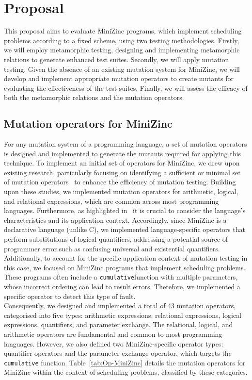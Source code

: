 \section{Proposal}
\label{sec:proposal}
This proposal aims to evaluate MiniZinc programs, which implement scheduling problems according to a fixed scheme, using two testing methodologies. Firstly, we will employ metamorphic testing, designing and implementing metamorphic relations to generate enhanced test suites. Secondly, we will apply mutation testing. Given the absence of an existing mutation system for MiniZinc, we will develop and implement appropriate mutation operators to create mutants for evaluating the effectiveness of the test suites. Finally, we will assess the efficacy of both the metamorphic relations and the mutation operators.

\subsection{Mutation operators for MiniZinc}

For any mutation system of a programming language, a set of mutation operators is designed and implemented to generate the mutants required for applying this technique. To implement an initial set of operators for MiniZinc, we drew upon existing research, particularly focusing on identifying a sufficient or minimal set of mutation operators~\cite{Offutt96OpMut,Mresa99OpMut,PapadakisM10} to enhance the efficiency of mutation testing. Building upon these studies, we implemented mutation operators for arithmetic, logical, and relational expressions, which are common across most programming languages. Furthermore, as highlighted in~\cite{Mresa99OpMut} it is crucial to consider the language's characteristics and its application context. Accordingly, since MiniZinc is a declarative language (unlike C), we implemented language-specific operators that perform substitutions of logical quantifiers, addressing a potential source of programmer error such as confusing universal and existential quantifiers. Additionally, to account for the specific application context of mutation testing in this case, we focused on MiniZinc programs that implement scheduling problems. These programs often include a \texttt{cumulative}function with multiple parameters, whose incorrect ordering can lead to result errors. Therefore, we implemented a specific operator to detect this type of fault.\\

Consequently, we designed and implemented a total of 43 mutation operators, categorised into five types: arithmetic expressions, relational expressions, logical expressions, quantifiers, and parameter exchange. The relational, logical, and arithmetic operators are fundamental and common to most programming languages. However, we also defined two MiniZinc-specific operator types: quantifier operators and the parameter exchange operator, which targets the \texttt{cumulative} function. Table~\ref{tab:Op-MiniZinc} details the mutation operators for MiniZinc within the context of scheduling problems, classified by these categories.

